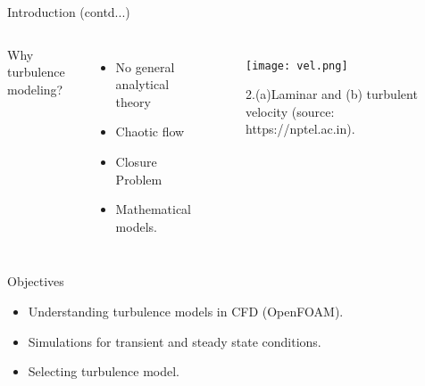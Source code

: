 \documentclass [xcolor=svgnames, t] {beamer}
\begin{document}
\begin{frame}{Introduction (contd...)}
\begin{center}
    

\begin{columns}[onlytextwidth]
Why turbulence modeling?\\
\vspace{1cm}
\begin{itemize}

\item  No general analytical theory
\item  Chaotic flow 
\item  Closure Problem

\item Mathematical models.

\end{itemize}
\begin{figure}
    \centering
    \texttt{[image: vel.png]}
    \caption{2.(a)Laminar and (b) turbulent velocity (source: https://nptel.ac.in).}
\end{figure}
\end{columns}

\end{center}



\end{frame}



\begin{frame}{Objectives}
 \vspace{1.5cm}   
\begin{itemize}
    \item Understanding turbulence models in CFD (OpenFOAM).
    \item Simulations for transient and steady state conditions.
    \item Selecting  turbulence model.
\end{itemize}
\end{frame}
\end{document}
